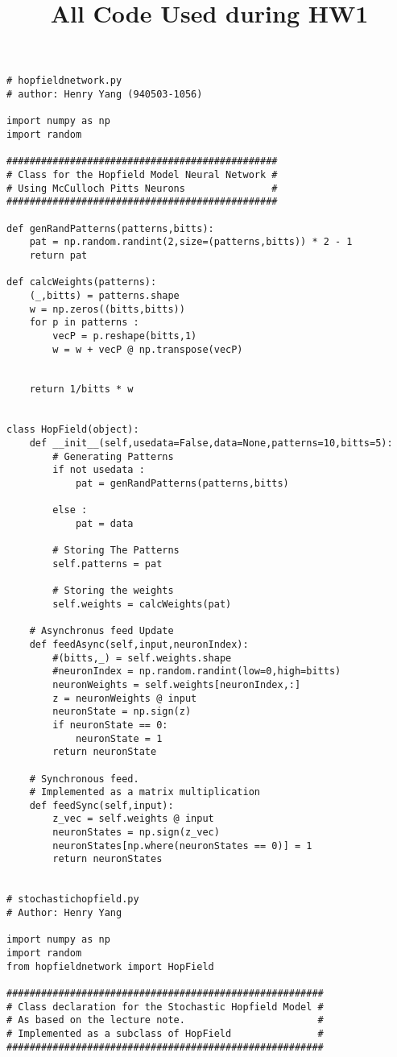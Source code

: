 \documentclass{article}
\title{All Code Used during HW1}
\begin{document}
\maketitle

\begin{verbatim}
# hopfieldnetwork.py
# author: Henry Yang (940503-1056)

import numpy as np
import random

###############################################
# Class for the Hopfield Model Neural Network #
# Using McCulloch Pitts Neurons               #
###############################################

def genRandPatterns(patterns,bitts):
    pat = np.random.randint(2,size=(patterns,bitts)) * 2 - 1
    return pat

def calcWeights(patterns):
    (_,bitts) = patterns.shape 
    w = np.zeros((bitts,bitts))
    for p in patterns :
        vecP = p.reshape(bitts,1)
        w = w + vecP @ np.transpose(vecP)


    return 1/bitts * w


class HopField(object):
    def __init__(self,usedata=False,data=None,patterns=10,bitts=5):
        # Generating Patterns
        if not usedata :
            pat = genRandPatterns(patterns,bitts)

        else :
            pat = data

        # Storing The Patterns
        self.patterns = pat

        # Storing the weights
        self.weights = calcWeights(pat)

    # Asynchronus feed Update
    def feedAsync(self,input,neuronIndex):
        #(bitts,_) = self.weights.shape
        #neuronIndex = np.random.randint(low=0,high=bitts)
        neuronWeights = self.weights[neuronIndex,:]
        z = neuronWeights @ input
        neuronState = np.sign(z)
        if neuronState == 0:
            neuronState = 1
        return neuronState
    
    # Synchronous feed.
    # Implemented as a matrix multiplication
    def feedSync(self,input):
        z_vec = self.weights @ input
        neuronStates = np.sign(z_vec)
        neuronStates[np.where(neuronStates == 0)] = 1
        return neuronStates

        
# stochastichopfield.py
# Author: Henry Yang

import numpy as np
import random
from hopfieldnetwork import HopField

#######################################################
# Class declaration for the Stochastic Hopfield Model #
# As based on the lecture note.                       #
# Implemented as a subclass of HopField               #
#######################################################


\end{verbatim}
\end{document}
